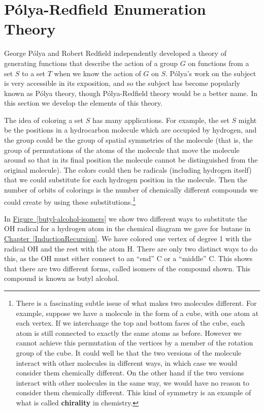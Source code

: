 \documentclass[10pt,]{book}
\newcommand{\terminology}[1]{\textbf{#1}}
\theoremstyle{plain}
\theoremstyle{definition}
\theoremstyle{definition}
\numberwithin{equation}{chapter}
\begin{document}
\section[{Pólya-Redfield Enumeration Theory}]{Pólya-Redfield Enumeration Theory}\label{sec_groups-polya}
George Pólya and Robert Redfield independently developed a theory of generating functions that describe the action of a group \(G\) on functions from a set \(S\) to a set \(T\) when we know the action of \(G\) on \(S\). Pólya's work on the subject is very accessible in its exposition, and so the subject has become popularly known as Pólya theory, though Pólya-Redfield theory would be a better name. In this section we develop the elements of this theory.%
\par
The idea of coloring a set \(S\) has many applications. For example, the set \(S\) might be the positions in a hydrocarbon molecule which are occupied by hydrogen, and the group could be the group of spatial symmetries of the molecule (that is, the group of permutations of the atoms of the molecule that move the molecule around so that in its final position the molecule cannot be distinguished from the original molecule). The colors could then be radicals (including hydrogen itself) that we could substitute for each hydrogen position in the molecule. Then the number of orbits of colorings is the number of chemically different compounds we could create by using these substitutions.\footnote{There is a fascinating subtle issue of what makes two molecules different.  For example, suppose we have a molecule in the form of a cube, with one atom at each vertex.  If we interchange the top and bottom faces of the cube, each atom is still connected to exactly the same atoms as before.   However we cannot achieve this permutation of the vertices by a member of the rotation group of the cube.  It could well be that the two versions of the molecule interact with other molecules in different ways, in which case we would consider them chemically different.  On the other hand if the two versions interact with other molecules in the same way, we would have no reason to consider them chemically different.  This kind of symmetry is an example of what is called \terminology{chirality} in chemistry.\label{fn-24}}%
\par
In \hyperref[butyl-alcohol-isomers]{Figure~\ref{butyl-alcohol-isomers}} we show two different ways to substitute the OH radical for a hydrogen atom in the chemical diagram we gave for butane in \hyperref[InductionRecursion]{Chapter~\ref{InductionRecursion}}. We have colored one vertex of degree 1 with the radical OH and the rest with the atom H. There are only two distinct ways to do this, as the OH must either connect to an ``end'' C or a ``middle'' C. This shows that there are two different forms, called isomers of the compound shown. This compound is known as butyl alcohol.%
\end{document}
